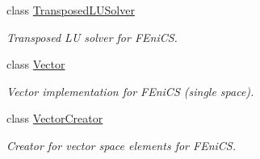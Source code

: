 \begin{DoxyCompactItemize}
class \hyperlink{classSpacy_1_1FEniCS_1_1TransposedLUSolver}{Transposed\+L\+U\+Solver}
\begin{DoxyCompactList}\small\item\em Transposed L\+U solver for F\+Eni\+C\+S. \end{DoxyCompactList}\item 
class \hyperlink{classSpacy_1_1FEniCS_1_1Vector}{Vector}
\begin{DoxyCompactList}\small\item\em Vector implementation for F\+Eni\+C\+S (single space). \end{DoxyCompactList}\item 
class \hyperlink{classSpacy_1_1FEniCS_1_1VectorCreator}{Vector\+Creator}
\begin{DoxyCompactList}\small\item\em Creator for vector space elements for F\+Eni\+C\+S. \end{DoxyCompactList}\end{DoxyCompactItemize}
